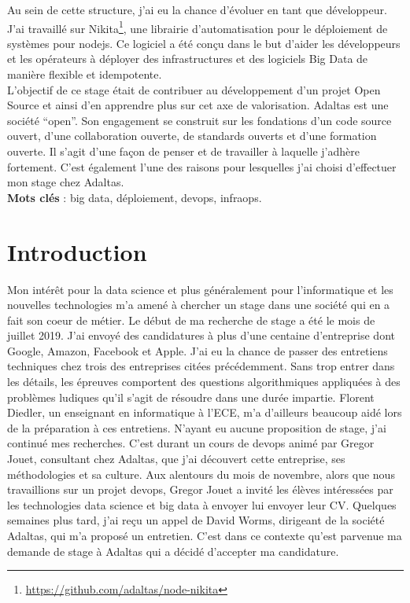 \documentclass[12pt, french]{report}
\begin{document}
Au sein de cette structure, j'ai eu la chance d'évoluer en tant que développeur. J'ai travaillé sur Nikita\footnote{\href{https://github.com/adaltas/node-nikita}{https://github.com/adaltas/node-nikita}}, une librairie d’automatisation pour le déploiement de systèmes pour \gls{nodejs}. Ce logiciel a été conçu dans le but d'aider les développeurs et les opérateurs à déployer des infrastructures et des logiciels Big Data de manière flexible et idempotente.\\

L'objectif de ce stage était de contribuer au développement d'un projet Open Source et ainsi d'en apprendre plus sur cet axe de valorisation. Adaltas est une société “open”. Son engagement se construit sur les fondations d’un code source ouvert, d’une collaboration ouverte, de standards ouverts et d’une formation ouverte. Il s'agit d'une façon de penser et de travailler à laquelle j'adhère fortement. C'est également l'une des raisons pour lesquelles j'ai choisi d'effectuer mon stage chez Adaltas.\\

\noindent\textbf{Mots clés} : big data, déploiement, devops, infraops.

\begingroup
\hypersetup{linkcolor=black}
\listoffigures
\tableofcontents
\newpage
\endgroup

\chapter*{Introduction}

Mon intérêt pour la data science et plus généralement pour l’informatique et les nouvelles technologies m’a amené à chercher un stage dans une société qui en a fait son coeur de métier. Le début de ma recherche de stage a été le mois de juillet 2019. J'ai envoyé des candidatures à plus d'une centaine d'entreprise dont Google, Amazon, Facebook et Apple. J'ai eu la chance de passer des entretiens techniques chez trois des entreprises citées précédemment. Sans trop entrer dans les détails, les épreuves comportent des questions algorithmiques appliquées à des problèmes ludiques qu'il s'agit de résoudre dans une durée impartie. Florent Diedler, un enseignant en informatique à l'ECE, m'a d'ailleurs beaucoup aidé lors de la préparation à ces entretiens. N'ayant eu aucune proposition de stage, j'ai continué mes recherches. C'est durant un cours de \gls{devops} animé par Gregor Jouet, consultant chez Adaltas, que j'ai découvert cette entreprise, ses méthodologies et sa culture. Aux alentours du mois de novembre, alors que nous travaillions sur un projet \gls{devops}, Gregor Jouet a invité les élèves intéressées par les technologies data science et big data à envoyer lui envoyer leur CV. Quelques semaines plus tard, j'ai reçu un appel de David Worms, dirigeant de la société Adaltas, qui m'a proposé un entretien. C'est dans ce contexte qu'est parvenue ma demande de stage à Adaltas qui a décidé d'accepter ma candidature.\\
\end{document}
